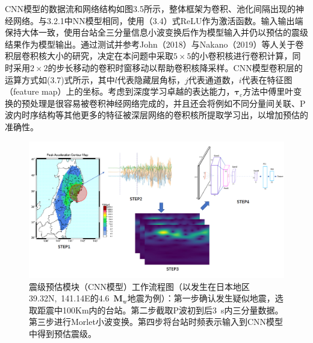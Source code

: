 \indent CNN模型的数据流和网络结构如图3.5所示，整体框架为卷积、池化间隔出现的神经网络。与3.2.1中NN模型相同，使用（3.4）式ReLU作为激活函数。输入输出端保持大体一致，使用台站全三分量信息小波变换后作为模型输入并仍以预估的震级结果作为模型输出。通过测试并参考John（2018）与Nakano（2019）等人关于卷积层卷积核大小的研究，决定在本问题中采取$5\times5$的小卷积核进行卷积计算，同时采用$2\times2$的步长移动的卷积时窗移动以帮助卷积核降采样。CNN模型卷积层的运算方式如(3.7)式所示，其中$l$代表隐藏层角标，$j$代表通道数，$i$代表在特征图（feature map）上的坐标。考虑到深度学习卓越的表达能力，$\mathbf{\tau}_{\mathrm{c}}$方法中傅里叶变换的预处理是很容易被卷积神经网络完成的，并且还会将例如不同分量间关联、P波内时序结构等其他更多的特征被深层网络的卷积核所提取学习出，以增加预估的准确性。\\
 \begin{figure}[!h]%
	\centering  %
	\includegraphics[width=\linewidth]{img/Flow.jpg}  %
	\caption{震级预估模块（CNN模型）工作流程图（以发生在日本地区39.32N,~141.14E的4.6~$\mathbf{M}_{\mathrm{w}}$地震为例）：第一步确认发生疑似地震，选取距震中100Km内的台站。第二步截取P波初到后3~s内三分量数据。第三步进行Morlet小波变换。第四步将台站时频表示输入到CNN模型中得到预估震级。}  %
	\label{fig:mcmthesis-logo}   %
\end{figure}

